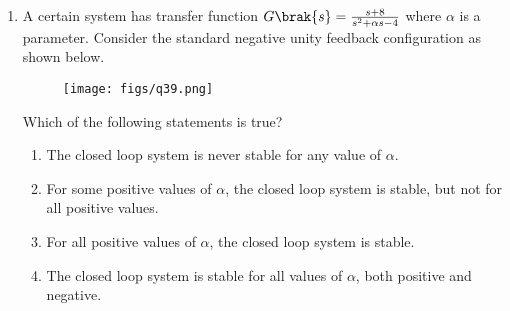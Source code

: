 \documentclass[a4paper, 11pt]{article}
\begin{document}
\begin{enumerate}
    \hfill{}
    
    \item A certain system has transfer function $G\brak{s} = \frac{s+8}{s^2+\alpha s - 4}$ where $\alpha$ is a parameter. Consider the standard negative unity feedback configuration as shown below.
    \begin{figure}[H]
        \centering
        \texttt{[image: figs/q39.png]}
        \caption*{}
        \label{fig:q39}
    \end{figure}
    Which of the following statements is true?
    \begin{enumerate}
        \item The closed loop system is never stable for any value of $\alpha$.
        \item For some positive values of $\alpha$, the closed loop system is stable, but not for all positive values.
        \item For all positive values of $\alpha$, the closed loop system is stable.
        \item The closed loop system is stable for all values of $\alpha$, both positive and negative.
    \end{enumerate}
    
    \hfill{}
    

\end{enumerate}
\end{document}
